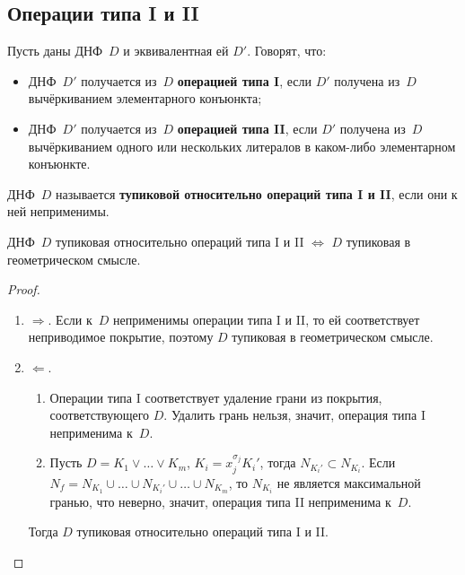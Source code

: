 \subsection{Операции типа I и II}
Пусть даны ДНФ~$D$ и эквивалентная ей $D'$.
Говорят, что:
\begin{itemize}
	\item ДНФ~$D'$ получается из~$D$ \textbf{операцией типа I}, если $D'$ получена из~$D$ вычёркиванием элементарного конъюнкта;
	\item ДНФ~$D'$ получается из~$D$ \textbf{операцией типа II}, если $D'$ получена из~$D$ вычёркиванием одного или нескольких литералов в каком-либо элементарном конъюнкте.
\end{itemize}

ДНФ~$D$ называется \textbf{тупиковой относительно операций типа I и II}, если они к ней неприменимы.

\begin{statement}
ДНФ~$D$ тупиковая относительно операций типа I и II $\Leftrightarrow$ $D$ тупиковая в геометрическом смысле.
\end{statement}
\begin{proof}
\begin{enumerate}
	\item $\Rightarrow$. Если к~$D$ неприменимы операции типа I и II, то ей соответствует неприводимое покрытие, поэтому $D$ тупиковая в геометрическом смысле.
	\item $\Leftarrow$.
	\begin{enumerate}
		\item Операции типа I соответствует удаление грани из покрытия, соответствующего $D$.
		Удалить грань нельзя, значит, операция типа I неприменима к~$D$.
		\item Пусть $D = K_1 \lor \ldots \lor K_m$, $K_i = x_j^{\sigma_j} K_i'$, тогда $N_{K_i'} \subset N_{K_i}$.
		Если $N_f = N_{K_1} \cup \ldots \cup N_{K_i'} \cup \ldots \cup N_{K_m}$, то $N_{K_i}$ не является максимальной гранью, что неверно, значит, операция типа II неприменима к~$D$.
	\end{enumerate}
	
	Тогда $D$ тупиковая относительно операций типа I и II.
\end{enumerate}
\end{proof}